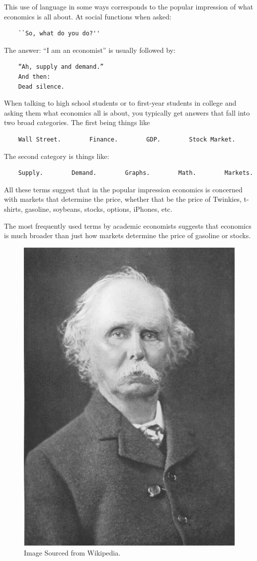 \documentclass[
]{book}
\begin{document}
This use of language in some ways corresponds to the popular impression of what economics is all about. At social functions when asked:

\begin{verbatim}
    ``So, what do you do?''
\end{verbatim}

The answer: ``I am an economist'' is usually followed by:

\begin{verbatim}
    “Ah, supply and demand.”
    And then:
    Dead silence.
\end{verbatim}

When talking to high school students or to first-year students in college and asking them what economics all is about, you typically get answers that fall into two broad categories. The first being things like

\begin{verbatim}
    Wall Street.        Finance.        GDP.        Stock Market.
\end{verbatim}

The second category is things like:

\begin{verbatim}
    Supply.        Demand.        Graphs.        Math.        Markets.
\end{verbatim}

All these terms suggest that in the popular impression economics is concerned with markets that determine the price, whether that be the price of Twinkies, t-shirts, gasoline, soybeans, stocks, options, iPhones, etc.

The most frequently used terms by academic economists suggests that economics is much broader than just how markets determine the price of gasoline or stocks.

\begin{figure}

{\centering \includegraphics[width=0.5\linewidth]{img/ch0/Alfred_Marshall} 

}

\caption{Image Sourced from Wikipedia.}\label{fig:fig002}
\end{figure}
\end{document}

